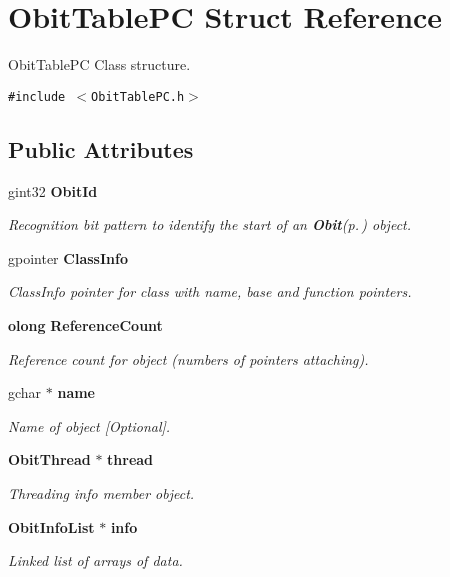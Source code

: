 \section{Obit\-Table\-PC Struct Reference}
\label{structObitTablePC}
Obit\-Table\-PC Class structure.  


{\tt \#include $<$Obit\-Table\-PC.h$>$}

\subsection*{Public Attributes}
\begin{CompactItemize}
\item 
gint32 {\bf Obit\-Id}
\begin{CompactList}\small\item\em Recognition bit pattern to identify the start of an {\bf Obit}{\rm (p.\,\pageref{structObit})} object. \item\end{CompactList}\item 
gpointer {\bf Class\-Info}
\begin{CompactList}\small\item\em Class\-Info pointer for class with name, base and function pointers. \item\end{CompactList}\item 
{\bf olong} {\bf Reference\-Count}
\begin{CompactList}\small\item\em Reference count for object (numbers of pointers attaching). \item\end{CompactList}\item 
gchar $\ast$ {\bf name}
\begin{CompactList}\small\item\em Name of object [Optional]. \item\end{CompactList}\item 
{\bf Obit\-Thread} $\ast$ {\bf thread}
\begin{CompactList}\small\item\em Threading info member object. \item\end{CompactList}\item 
{\bf Obit\-Info\-List} $\ast$ {\bf info}
\begin{CompactList}\small\item\em Linked list of arrays of data. \item\end{CompactList}\item 

\end{CompactItemize}
